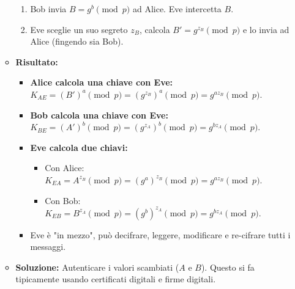 \begin{itemize}
\begin{itemize}
\begin{enumerate}
                    \item Bob invia $B = g^b \pmod{p}$ ad Alice. Eve intercetta $B$.
                    \item Eve sceglie un suo segreto $z_B$, calcola $B' = g^{z_B} \pmod{p}$ e lo invia ad Alice (fingendo sia Bob).
                \end{enumerate}
            \item \textbf{Risultato:}
                \begin{itemize}
                    \item \textbf{Alice calcola una chiave con Eve:} $K_{AE} = (B')^a \pmod{p} = (g^{z_B})^a \pmod{p} = g^{az_B} \pmod{p}$.
                    \item \textbf{Bob calcola una chiave con Eve:} $K_{BE} = (A')^b \pmod{p} = (g^{z_A})^b \pmod{p} = g^{bz_A} \pmod{p}$.
                    \item \textbf{Eve calcola due chiavi:}
                        \begin{itemize}
                            \item Con Alice: $K_{EA} = A^{z_B} \pmod{p} = (g^a)^{z_B} \pmod{p} = g^{az_B} \pmod{p}$.
                            \item Con Bob: $K_{EB} = B^{z_A} \pmod{p} = (g^b)^{z_A} \pmod{p} = g^{bz_A} \pmod{p}$.
                        \end{itemize}
                    \item Eve è "in mezzo", può decifrare, leggere, modificare e re-cifrare tutti i messaggi.
                \end{itemize}
            \item \textbf{Soluzione:} Autenticare i valori scambiati ($A$ e $B$). Questo si fa tipicamente usando certificati digitali e firme digitali.
        \end{itemize}
        \begin{figure}[H]
            \centering
\end{figure}
\end{itemize}
